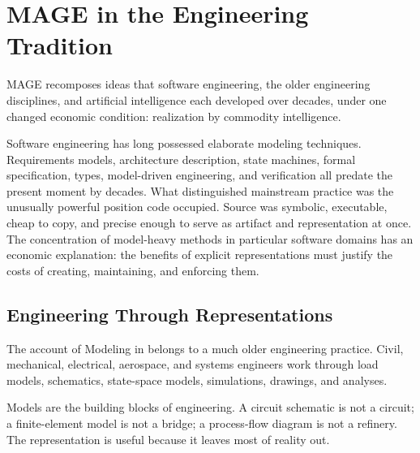 


\chapter{MAGE in the Engineering Tradition}

MAGE recomposes ideas that software engineering, the older engineering disciplines, and artificial intelligence each developed over decades, under one changed economic condition: realization by commodity intelligence.

Software engineering has long possessed elaborate modeling techniques. Requirements models, architecture description, state machines, formal specification, types, model-driven engineering, and verification all predate the present moment by decades. What distinguished mainstream practice was the unusually powerful position code occupied. Source was symbolic, executable, cheap to copy, and precise enough to serve as artifact and representation at once. The concentration of model-heavy methods in particular software domains has an economic explanation: the benefits of explicit representations must justify the costs of creating, maintaining, and enforcing them.

\section{Engineering Through Representations}\label{heading:engineering-through-representations}

The account of Modeling in  belongs to a much older engineering practice. Civil, mechanical, electrical, aerospace, and systems engineers work through load models, schematics, state-space models, simulations, drawings, and analyses.


Models are the building blocks of engineering. A circuit schematic is not a circuit; a finite-element model is not a bridge; a process-flow diagram is not a refinery. The representation is useful because it leaves most of reality out.

